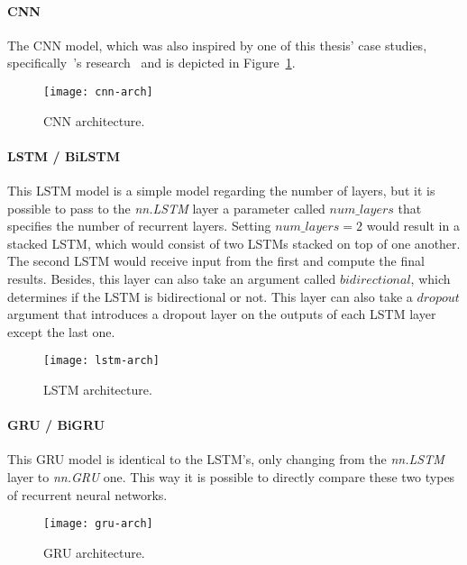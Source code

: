 \paragraph{CNN}

The \gls{CNN} model, which was also inspired by one of this thesis' case studies, specifically~\citeauthor{Zou2018AGenomics}'s research~\cite{Zou2018AGenomics} and is depicted in Figure~\ref{fig:cnn-arch}. 

\begin{figure}[htbp]
    \centering
    \texttt{[image: cnn-arch]}
    \caption{CNN architecture.}
    \label{fig:cnn-arch}
\end{figure}

\paragraph{LSTM / BiLSTM}

This \gls{LSTM} model is a simple model regarding the number of layers, but it is possible to pass to the \textit{nn.LSTM} layer a parameter called $num\_layers$ that specifies the number of recurrent layers. Setting $num \_layers = 2$ would result in a stacked \gls{LSTM}, which would consist of two \gls{LSTM}s stacked on top of one another. The second \gls{LSTM} would receive input from the first and compute the final results. Besides, this layer can also take an argument called $bidirectional$, which determines if the \gls{LSTM} is bidirectional or not. This layer can also take a $dropout$ argument that introduces a dropout layer on the outputs of each \gls{LSTM} layer except the last one.

\begin{figure}[htbp]
    \centering
    \texttt{[image: lstm-arch]}
    \caption{LSTM architecture.}
    \label{fig:lstm-arch}
\end{figure}

\paragraph{GRU / BiGRU} This \gls{GRU} model is identical to the \gls{LSTM}'s, only changing from the \textit{nn.LSTM} layer to \textit{nn.GRU} one. This way it is possible to directly compare these two types of recurrent neural networks.

\begin{figure}[htbp]
    \centering
    \texttt{[image: gru-arch]}
    \caption{GRU architecture.}
    \label{fig:gru-arch}
\end{figure}

